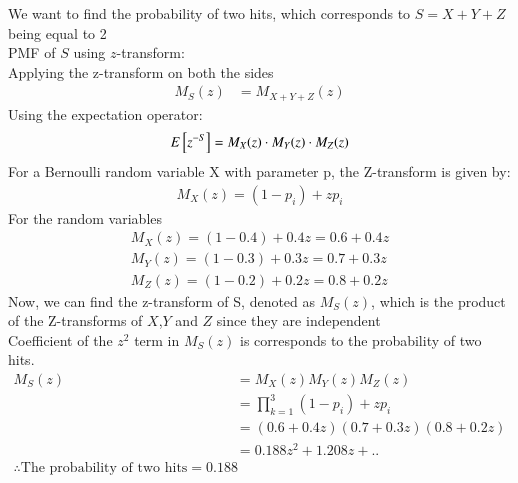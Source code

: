\documentclass[journal,12pt,onecolumn]{IEEEtran}
\theoremstyle{remark}
\begin{document}
We want to find the probability of two hits, which corresponds to $S = X + Y + Z$ being equal to 2\\
PMF of $S$ using $z$-transform:\\
Applying the z-transform on both the sides\\
\begin{align}
	M_S(z) &= M_{X+Y+Z}(z)
\end{align}
Using the expectation operator:\\
\begin{align}
	E{}\left[z^{-S}\right]= M_X(z)\cdot M_Y(z)\cdot M_Z(z)
\end{align}
For a Bernoulli random variable X with parameter p, the Z-transform is given by:
\begin{align}
M_X(z) = (1 - p_i) +zp_i 
\end{align}
For the random variables\\
\begin{align}
M_X(z)=(1-0.4)+0.4z=0.6+0.4z \\
M_Y(z)=(1-0.3)+0.3z=0.7+0.3z \\
M_Z(z)=(1-0.2)+0.2z=0.8+0.2z
\end{align}
Now, we can find the z-transform of S, denoted as $M_S(z)$, which is the product of the Z-transforms of $X$,$Y$ and $Z$ since they are independent\\
Coefficient of the $z^{2}$ term in $M_S(z)$ is corresponds to the probability of two hits. \\
\begin{align}
M_S(z)&=M_X(z)M_Y(z)M_Z(z)\\
 &= \prod_{k=1}^{3} (1 - p_i) +zp_i \\
&=(0.6+0.4z) (0.7+0.3z) (0.8+0.2z)\\
&=0.188z^{2}+1.208z+..\\
\therefore \text{The probability of two hits} =0.188
\end{align}
\end{document}
